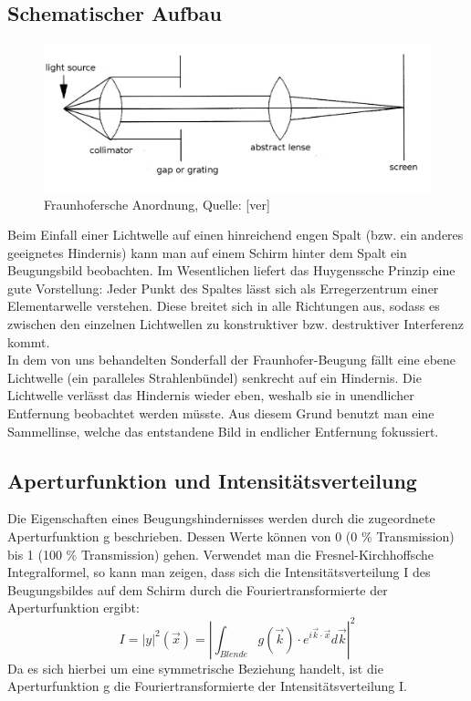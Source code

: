 \subsection{Schematischer Aufbau}
\begin{center}
\begin{figure}[htbp]
\includegraphics[scale=0.6]{Bilder/fraunhofer}
\caption{Fraunhofersche Anordnung, Quelle: [ver]}
\end{figure}
\end{center}
Beim Einfall einer Lichtwelle auf einen hinreichend engen Spalt (bzw. ein anderes geeignetes Hindernis) kann man auf einem Schirm hinter dem Spalt ein Beugungsbild beobachten. Im Wesentlichen liefert das Huygenssche Prinzip eine gute Vorstellung: Jeder Punkt des Spaltes lässt sich als Erregerzentrum einer Elementarwelle verstehen. Diese breitet sich in alle Richtungen aus, sodass es zwischen den einzelnen Lichtwellen zu konstruktiver bzw. destruktiver Interferenz kommt.\\
In dem von uns behandelten Sonderfall der Fraunhofer-Beugung fällt eine ebene Lichtwelle (ein paralleles Strahlenbündel) senkrecht auf ein Hindernis. Die Lichtwelle verlässt das Hindernis wieder eben, weshalb sie in unendlicher Entfernung beobachtet werden müsste. Aus diesem Grund benutzt man eine Sammellinse, welche das entstandene Bild in endlicher Entfernung fokussiert.
\subsection{Aperturfunktion und Intensitätsverteilung}
Die Eigenschaften eines Beugungshindernisses werden durch die zugeordnete Aperturfunktion g beschrieben. Dessen Werte können von 0 (0 \% Transmission) bis 1 (100 \% Transmission) gehen. Verwendet man die Fresnel-Kirchhoffsche Integralformel, so kann man zeigen, dass sich die Intensitätsverteilung I des Beugungsbildes auf dem Schirm durch die Fouriertransformierte der Aperturfunktion ergibt:
\[I=\left| y \right| ^{2}(\vec{x})=\left|\int_{Blende}g(\vec{k})\cdot e^{i\vec{k}\cdot\vec{x}}d\vec{k}\right|^{2}\]
Da es sich hierbei um eine symmetrische Beziehung handelt, ist die Aperturfunktion g die Fouriertransformierte der Intensitätsverteilung I.
